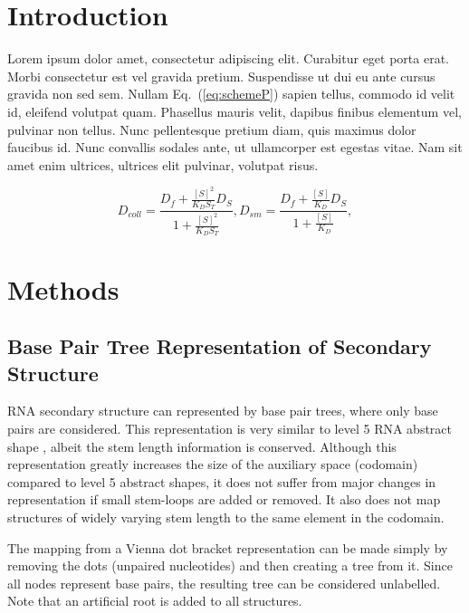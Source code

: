 \documentclass[10pt,letterpaper]{article}
\begin{document}
\linenumbers

\section*{Introduction}
Lorem ipsum dolor %
amet, consectetur adipiscing elit. Curabitur eget porta erat. Morbi consectetur est vel gravida pretium. Suspendisse ut dui eu ante cursus gravida non sed sem. Nullam Eq.~(\ref{eq:schemeP}) sapien tellus, commodo id velit id, eleifend volutpat quam. Phasellus mauris velit, dapibus finibus elementum vel, pulvinar non tellus. Nunc pellentesque pretium diam, quis maximus dolor faucibus id. Nunc convallis sodales ante, ut ullamcorper est egestas vitae. Nam sit amet enim ultrices, ultrices elit pulvinar, volutpat risus.

\begin{equation}\label{eq:schemeP} 
D_{coll} = \frac{D_f+\frac{[S]^2}{K_D S_T} D_S} {1+\frac{[S]^2}{K_D S_T}}, 
D_{sm} = \frac{D_f+ \frac{[S]}{K_D} D_S}{1+\frac{[S]}{K_D}},
\end{equation}





\newpage
\section*{Methods}

\subsection*{Base Pair Tree Representation of Secondary Structure}
RNA secondary structure can represented by base pair trees, where only base pairs are considered. This representation is very similar to level 5 RNA abstract shape \cite{abstract_shapes}, albeit the stem length information is conserved.
Although this representation greatly increases the size of the auxiliary space (codomain) compared to level 5 abstract shapes, it does not suffer from major changes in representation if small stem-loops are added or removed. It also does not map structures of widely varying stem length to the same element in the codomain.

\noindent The mapping from a Vienna dot bracket representation can be made simply by removing the dots (unpaired nucleotides) and then creating a tree from it. Since all nodes represent base pairs, the resulting tree can be considered unlabelled. Note that an artificial root is added to all structures. 
\end{document}
